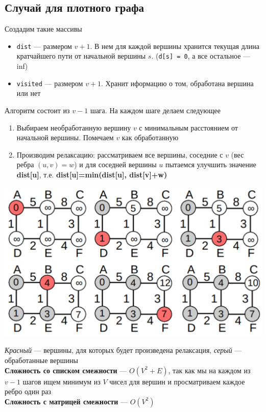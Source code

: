 \documentclass[a4paper]{article}
\newcommand{\code}[1]{\colorbox{codegray}{\texttt{#1}}}
\begin{document}
\subsection*{Случай для плотного графа}
Создадим такие массивы
\begin{itemize}
    \item \code{dist} — размером $v+1$. В нем для каждой вершины хранится текущая длина кратчайшего пути от начальной вершины $s$. (\code{d[s] = 0}, а все остальное — inf)
    \item \code{visited} — размером $v+1$. Хранит иформацию о том, обработана вершина или нет
\end{itemize}
Алгоритм состоит из $v-1$ шага. На каждом шаге делаем следующее
\begin{enumerate}
    \item Выбираем необработанную вершину $v$ с минимальным расстоянием от начальной вершины. Помечаем $v$ как обработанную
    \item Производим релаксацию: рассматриваем все вершины, соседние с $v$ (вес ребра $(u,v)=w$) и для соседней вершины $u$ пытаемся улучшить значение \textbf{dist[u]}, т.е. \textbf{dist[u]=min(dist[u], dist[v]+w)}
\end{enumerate}
\begin{center}
    \includegraphics[width=0.8\linewidth]{dijkstra.png}
    \label{dijkstra}
\end{center}
\textit{Красный} — вершины, для которых будет произведена релаксация, \textit{серый} — обработанные вершины\\[2mm]
\textbf{Сложность со списком смежности} — $O(V^2+E)$, так как мы на каждом из $v-1$ шагов ищем минимум из $V$ чисел для вершин и просматриваем каждое ребро один раз\\[2mm]
\textbf{Сложность с матрицей смежности} — $O(V^2)$
\end{document}
